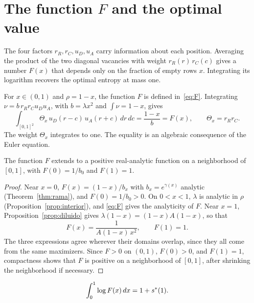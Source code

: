 \section{The function \texorpdfstring{$F$}{F} and the optimal value}\label{sec:F}

The four factors $r_R,r_C,u_D,u_A$ carry information about each position. Averaging the product of the two diagonal vacancies with
weight $r_R(r)\,r_C(c)$ gives a number $F(x)$ that depends only on the fraction of empty rows $x$. Integrating its logarithm recovers
the optimal entropy at mass one.

For $x\in(0,1)$ and $\rho=1-x$, the function $F$ is defined in~\eqref{eq:F}. Integrating $\nu=b\,r_Rr_Cu_Du_A$, with $b=\lambda x^2$
and $\int\nu=1-x$, gives \begin{equation}\label{eq:F_integral}
 \int_{[0,1]^2}\Theta_x\,u_D(r-c)\,u_A(r+c)\,dr\,dc=\frac{1-x}{b}=F(x),\qquad \Theta_x=r_Rr_C .
\end{equation} The weight $\Theta_x$ integrates to one. The equality is an algebraic consequence of the Euler equation.

\begin{teorema}[Analyticity of $F$]\label{thm:F} The function $F$ extends to a positive real-analytic function on a neighborhood of
$[0,1]$, with $F(0)=1/b_0$ and $F(1)=1$. \end{teorema}

\begin{proof} Near $x=0$, $F(x)=(1-x)/b_x$ with $b_x=e^{\gamma(x)}$ analytic (Theorem~\ref{thm:rama}), and $F(0)=1/b_0>0$. On $0<x<1$,
$\lambda$ is analytic in $\rho$ (Proposition~\ref{prop:interior}), and \eqref{eq:F} gives the analyticity of $F$. Near $x=1$,
Proposition~\ref{prop:diluido} gives $\lambda(1-x)=(1-x)A(1-x)$, so that \[
 F(x)=\frac1{A(1-x)\,x^2},\qquad F(1)=1 .
\] The three expressions agree wherever their domains overlap, since they all come from the same maximizers. Since $F>0$ on $(0,1)$,
$F(0)>0$, and $F(1)=1$, compactness shows that $F$ is positive on a neighborhood of $[0,1]$, after shrinking the neighborhood if necessary.
\end{proof}

\begin{proposicion}\label{prop:intlogF} \[
 \int_0^1\log F(x)\,dx=1+s^{*}(1).
\] \end{proposicion}

